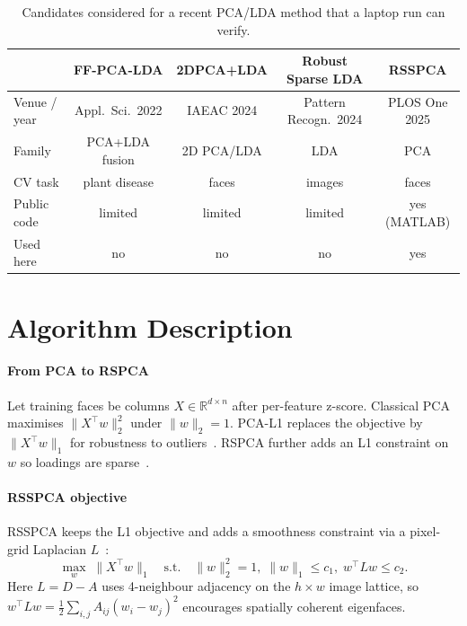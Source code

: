 \documentclass[11pt,a4paper]{article}
\begin{document}
\begin{table}[H]
\centering
\caption{Candidates considered for a recent PCA/LDA method that a laptop run can verify.}
\label{tab:choice}
\small
\begin{tabular}{lcccc}
\toprule
 & FF-PCA-LDA & 2DPCA+LDA & Robust Sparse LDA & RSSPCA \\
\midrule
Venue / year & Appl.\ Sci.\ 2022 & IAEAC 2024 & Pattern Recogn.\ 2024 & PLOS One 2025 \\
Family & PCA+LDA fusion & 2D PCA/LDA & LDA & PCA \\
CV task & plant disease & faces & images & faces \\
Public code & limited & limited & limited & yes (MATLAB) \\
Used here & no & no & no & yes \\
\bottomrule
\end{tabular}
\end{table}

\section{Algorithm Description}
\label{sec:algo}
\paragraph{From PCA to RSPCA}
Let training faces be columns $X\in\mathbb{R}^{d\times n}$ after per-feature z-score.
Classical PCA maximises $\|X^\top w\|_2^2$ under $\|w\|_2=1$.
PCA-L1 replaces the objective by $\|X^\top w\|_1$ for robustness to outliers~\cite{kwak2008pca}.
RSPCA further adds an L1 constraint on $w$ so loadings are sparse~\cite{meng2012rspca}.

\paragraph{RSSPCA objective}
RSSPCA keeps the L1 objective and adds a smoothness constraint via a pixel-grid Laplacian $L$~\cite{wang2025rsspca}:
\begin{equation}
\max_w \; \|X^\top w\|_1
\quad\text{s.t.}\quad
\|w\|_2^2=1,\;
\|w\|_1 \le c_1,\;
w^\top L w \le c_2.
\label{eq:rsspca}
\end{equation}
Here $L=D-A$ uses 4-neighbour adjacency on the $h\times w$ image lattice, so
$w^\top L w = \tfrac12\sum_{i,j} A_{ij}(w_i-w_j)^2$ encourages spatially coherent eigenfaces.
\end{document}
